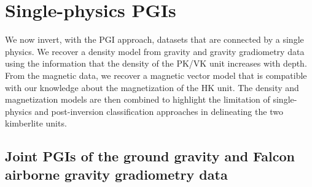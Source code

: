 \documentclass[paper, twocolumn]{geophysics} %
\begin{document}


\section{Single-physics PGIs}

We now invert, with the PGI approach, datasets that are connected by a single physics. We recover a density model from gravity and gravity gradiometry data using the information that the density of the PK/VK unit increases with depth. From the magnetic data, we recover a magnetic vector model that is compatible with our knowledge about the magnetization of the HK unit. The density and magnetization models are then combined to highlight the limitation of single-physics and post-inversion classification approaches in delineating the two kimberlite units.


\subsection{Joint PGIs of the ground gravity and Falcon airborne gravity gradiometry data}

\end{document}
